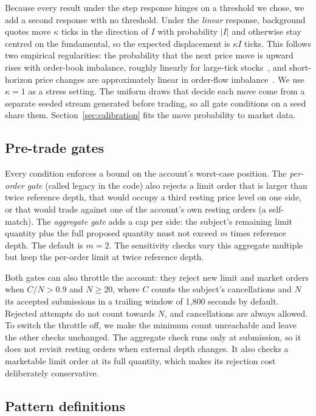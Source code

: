 \documentclass{article}
\begin{document}
Because every result under the step response hinges on a threshold we chose, we add a second response with no threshold. Under the \emph{linear} response, background quotes move $\kappa$ ticks in the direction of $I$ with probability $|I|$ and otherwise stay centred on the fundamental, so the expected displacement is $\kappa I$ ticks. This follows two empirical regularities: the probability that the next price move is upward rises with order-book imbalance, roughly linearly for large-tick stocks~\cite{r31}, and short-horizon price changes are approximately linear in order-flow imbalance~\cite{r30}. We use $\kappa = 1$ as a stress setting. The uniform draws that decide each move come from a separate seeded stream generated before trading, so all gate conditions on a seed share them. Section~\ref{sec:calibration} fits the move probability to market data.

\subsection{Pre-trade gates}

Every condition enforces a bound on the account's worst-case position. The \emph{per-order gate} (called legacy in the code) also rejects a limit order that is larger than twice reference depth, that would occupy a third resting price level on one side, or that would trade against one of the account's own resting orders (a self-match). The \emph{aggregate gate} adds a cap per side: the subject's remaining limit quantity plus the full proposed quantity must not exceed $m$ times reference depth. The default is $m = 2$. The sensitivity checks vary this aggregate multiple but keep the per-order limit at twice reference depth.

Both gates can also throttle the account: they reject new limit and market orders when $C/N > 0.9$ and $N \geq 20$, where $C$ counts the subject's cancellations and $N$ its accepted submissions in a trailing window of 1,800 seconds by default. Rejected attempts do not count towards $N$, and cancellations are always allowed. To switch the throttle off, we make the minimum count unreachable and leave the other checks unchanged. The aggregate check runs only at submission, so it does not revisit resting orders when external depth changes. It also checks a marketable limit order at its full quantity, which makes its rejection cost deliberately conservative.

\subsection{Pattern definitions}\label{sec:patterns}
\end{document}

